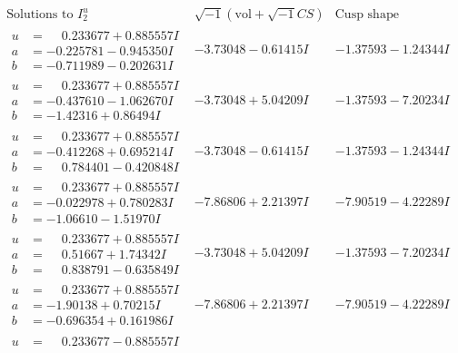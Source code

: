 \documentclass[1p]{elsarticle_modified}
\theoremstyle{definition}
\newcommand{\I}{\sqrt{-1}}
\begin{document}
$$\begin{array}{c|c|c}  
\text{Solutions to }I^u_{2}& \I (\text{vol} + \sqrt{-1}CS) & \text{Cusp shape}\\
 \hline 
\begin{aligned}
u &= \phantom{-}0.233677 + 0.885557 I \\
a &= -0.225781 - 0.945350 I \\
b &= -0.711989 - 0.202631 I\end{aligned}
 & -3.73048 - 0.61415 I & -1.37593 - 1.24344 I \\ \hline\begin{aligned}
u &= \phantom{-}0.233677 + 0.885557 I \\
a &= -0.437610 - 1.062670 I \\
b &= -1.42316 + 0.86494 I\end{aligned}
 & -3.73048 + 5.04209 I & -1.37593 - 7.20234 I \\ \hline\begin{aligned}
u &= \phantom{-}0.233677 + 0.885557 I \\
a &= -0.412268 + 0.695214 I \\
b &= \phantom{-}0.784401 - 0.420848 I\end{aligned}
 & -3.73048 - 0.61415 I & -1.37593 - 1.24344 I \\ \hline\begin{aligned}
u &= \phantom{-}0.233677 + 0.885557 I \\
a &= -0.022978 + 0.780283 I \\
b &= -1.06610 - 1.51970 I\end{aligned}
 & -7.86806 + 2.21397 I & -7.90519 - 4.22289 I \\ \hline\begin{aligned}
u &= \phantom{-}0.233677 + 0.885557 I \\
a &= \phantom{-}0.51667 + 1.74342 I \\
b &= \phantom{-}0.838791 - 0.635849 I\end{aligned}
 & -3.73048 + 5.04209 I & -1.37593 - 7.20234 I \\ \hline\begin{aligned}
u &= \phantom{-}0.233677 + 0.885557 I \\
a &= -1.90138 + 0.70215 I \\
b &= -0.696354 + 0.161986 I\end{aligned}
 & -7.86806 + 2.21397 I & -7.90519 - 4.22289 I \\ \hline\begin{aligned}
u &= \phantom{-}0.233677 - 0.885557 I \\

\end{aligned}
\end{array}$$
\end{document}
